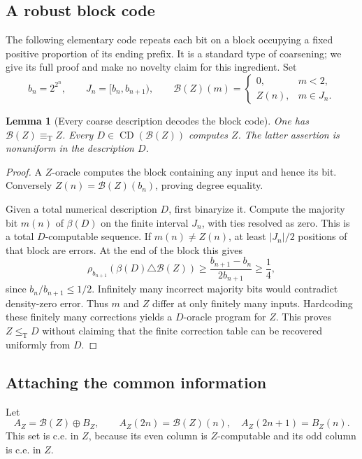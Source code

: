 \documentclass[11pt,a4paper]{article}
\newcommand{\leT}{\leq_{\mathrm T}}
\newcommand{\eqT}{\equiv_{\mathrm T}}
\newcommand{\CD}{\operatorname{CD}}
\newcommand{\Block}{\mathcal B}
\newtheorem{lemma}[theorem]{Lemma}
\theoremstyle{definition}
\theoremstyle{remark}
\begin{document}
\subsection{A robust block code}
The following elementary code repeats each bit on a block occupying a
fixed positive proportion of its ending prefix. It is a standard type of
coarsening; we give its full proof and make no novelty claim for this ingredient.
Set
\begin{equation}\label{eq:block}
 b_n=2^{2^n},\qquad J_n=[b_n,b_{n+1}),\qquad
 \Block(Z)(m)=
 \begin{cases}
 0,&m<2,\\
 Z(n),&m\in J_n.
 \end{cases}
\end{equation}

\begin{lemma}[Every coarse description decodes the block code]
\label{lem:block}
One has $\Block(Z)\eqT Z$. Every $D\in\CD(\Block(Z))$ computes $Z$.
The latter assertion is nonuniform in the description $D$.
\end{lemma}
\begin{proof}
A $Z$-oracle computes the block containing any input and hence its bit.
Conversely $Z(n)=\Block(Z)(b_n)$, proving degree equality.

Given a total numerical description $D$, first binaryize it. Compute the
majority bit $m(n)$ of $\beta(D)$ on the finite interval $J_n$, with ties
resolved as zero. This is a total $D$-computable sequence. If
$m(n)\ne Z(n)$, at least $|J_n|/2$ positions of that block are errors.
At the end of the block this gives
\begin{equation}\label{eq:blockbound}
 \rho_{b_{n+1}}(\beta(D)\triangle\Block(Z))
 \ge\frac{b_{n+1}-b_n}{2b_{n+1}}\ge\frac14,
\end{equation}
since $b_n/b_{n+1}\le1/2$.
Infinitely many incorrect majority bits would contradict density-zero
error. Thus $m$ and $Z$ differ at only finitely many inputs. Hardcoding
these finitely many corrections yields a $D$-oracle program for $Z$.
This proves $Z\leT D$ without claiming that the finite correction table
can be recovered uniformly from $D$.
\end{proof}

\subsection{Attaching the common information}
Let
\begin{equation}\label{eq:AZ}
 A_Z=\Block(Z)\oplus B_Z,
 \qquad A_Z(2n)=\Block(Z)(n),\quad A_Z(2n+1)=B_Z(n).
\end{equation}
This set is c.e. in $Z$, because its even column is $Z$-computable and its
odd column is c.e. in $Z$.
\end{document}

